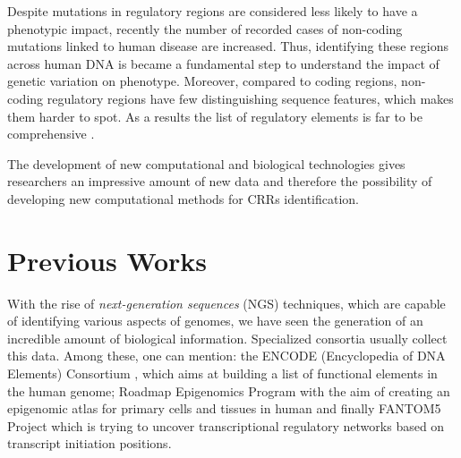 Despite mutations in regulatory regions are considered less likely to have a phenotypic impact, recently the number of recorded cases of non-coding mutations linked to human disease are increased.
Thus, identifying these regions across
human DNA is became a fundamental step to understand the impact of
genetic variation on phenotype. 
Moreover, compared to coding regions, non-coding regulatory regions have few distinguishing sequence features, which makes them harder to spot. As a results the list of regulatory elements is far to be comprehensive \cite{NarlikarRegulaotryelements}. 

The development of new computational and
biological technologies gives researchers an impressive amount of new data and therefore the possibility of developing new computational methods
for CRRs identification.



\section{Previous Works}
With the rise of \emph{next-generation sequences} (NGS) techniques, which are
capable of identifying various aspects of genomes, we have seen the generation of an incredible amount of biological information. Specialized consortia usually collect this data. Among these, one can mention: the ENCODE
(Encyclopedia of DNA Elements) Consortium \cite{ENCODE_data}, which aims at building a list of functional elements in the human genome; Roadmap Epigenomics Program \cite{ROADMAP} with the aim of creating an epigenomic atlas for primary cells and tissues in human and finally FANTOM5 Project \cite{FANTOM_data} which is trying to uncover transcriptional regulatory networks based on transcript initiation positions.

